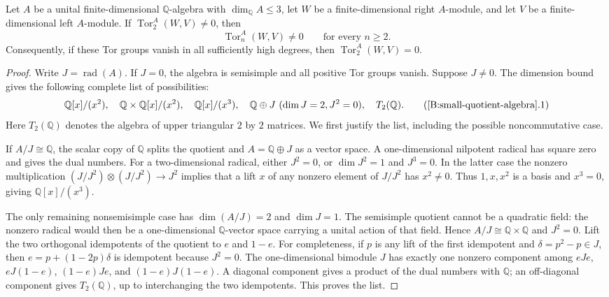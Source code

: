 \begin{lemma}\label{B:small-quotient-algebra}
Let $A$ be a unital finite-dimensional $\mathbb Q$-algebra with
$\dim_{\mathbb Q}A\leq3$, let $W$ be a finite-dimensional right
$A$-module, and let $V$ be a finite-dimensional left $A$-module.
If $\operatorname{Tor}_2^A(W,V)\ne0$, then
\[
  \operatorname{Tor}_n^A(W,V)\ne0\qquad\text{for every }n\geq2.
\]
Consequently, if these Tor groups vanish in all sufficiently high
degrees, then $\operatorname{Tor}_2^A(W,V)=0$.
\end{lemma}

\begin{proof}
Write $J=\operatorname{rad}(A)$.  If $J=0$, the algebra is semisimple
and all positive Tor groups vanish.  Suppose $J\ne0$.
The dimension bound gives the following complete list of possibilities:
\[
 \mathbb Q[x]/(x^2),\quad
 \mathbb Q\times\mathbb Q[x]/(x^2),\quad
 \mathbb Q[x]/(x^3),\quad
 \mathbb Q\oplus J\ (\dim J=2, J^2=0),\quad
 T_2(\mathbb Q).
 \tag{\ref{B:small-quotient-algebra}.1}
\]
Here $T_2(\mathbb Q)$ denotes the algebra of upper triangular
$2$ by $2$ matrices.  We first justify the list, including the possible
noncommutative case.

If $A/J\cong\mathbb Q$, the scalar copy of $\mathbb Q$ splits the
quotient and $A=\mathbb Q\oplus J$ as a vector space.  A
one-dimensional nilpotent radical has square zero and gives the dual
numbers.  For a two-dimensional radical, either $J^2=0$, or
$\dim J^2=1$ and $J^3=0$.  In the latter case the nonzero
multiplication
$(J/J^2)\otimes(J/J^2)\longrightarrow J^2$ implies that a lift
$x$ of any nonzero element of $J/J^2$ has $x^2\ne0$.
Thus $1,x,x^2$ is a basis and $x^3=0$, giving
$\mathbb Q[x]/(x^3)$.

The only remaining nonsemisimple case has
$\dim(A/J)=2$ and $\dim J=1$.  The semisimple quotient cannot be
a quadratic field: the nonzero radical would then be a one-dimensional
$\mathbb Q$-vector space carrying a unital action of that field.
Hence $A/J\cong\mathbb Q\times\mathbb Q$ and $J^2=0$.
Lift the two orthogonal idempotents of the quotient to $e$ and $1-e$.
For completeness, if $p$ is any lift of the first idempotent and
$\delta=p^2-p\in J$, then
$e=p+(1-2p)\delta$ is idempotent because $J^2=0$.
The one-dimensional bimodule $J$ has exactly one nonzero component
among $eJ e$, $eJ(1-e)$, $(1-e)Je$, and $(1-e)J(1-e)$.
A diagonal component gives a product of the dual numbers with
$\mathbb Q$; an off-diagonal component gives $T_2(\mathbb Q)$,
up to interchanging the two idempotents.  This proves the list.


\end{proof}
